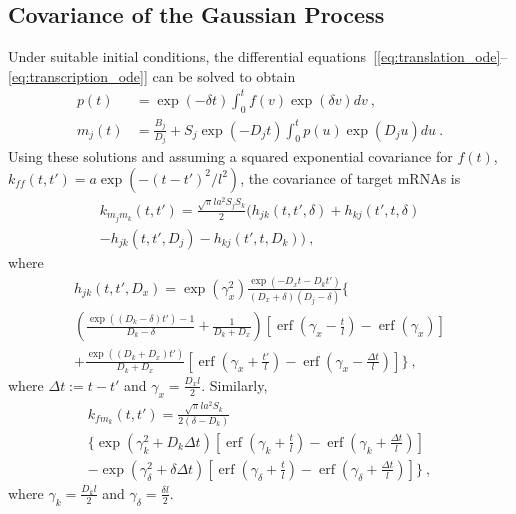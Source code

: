 \documentclass{pnastwo}
\newcommand{\erf}{\operatorname{erf}}
\begin{document}
\begin{article}
\begin{materials}
  \section{Covariance of the Gaussian Process}
  Under suitable initial conditions, the differential
  equations~[\ref{eq:translation_ode}--\ref{eq:transcription_ode}]
  can be solved to obtain
  \begin{align*}
    p(t) &= \exp(-\delta t) \int_0^t f(v) \exp(\delta v) dv\ , \\
    m_j(t) &= \frac{B_j}{D_j} + S_j \exp(-D_j t) \int_0^t p(u)
    \exp(D_j u) du\ .
  \end{align*}
  Using these solutions and assuming a squared exponential covariance
  for $f(t)$, $k_{ff}(t, t') = a \exp( -(t-t')^2/l^2)$, the covariance of target mRNAs is
  \begin{multline*}
    k_{m_j m_k}(t, t')
    = \frac{\sqrt{\pi} l a^2 S_j S_k}{2} \bigg(
    h_{jk}(t, t', \delta) + h_{kj}(t', t, \delta) \\
    - h_{jk}(t, t', D_j) - h_{kj}(t', t, D_k)
    \bigg)\ ,
  \end{multline*}
  where
  \begin{multline*}
    h_{jk}(t, t', D_x) = 
    \exp\left(\gamma_x^2\right)
    \frac{\exp(-D_x t - D_k t')}{(D_x + \delta) (D_j - \delta)}
    \bigg\{ 
    \\
    \left(\frac{\exp((D_k-\delta) t') - 1}{D_k-\delta} +
      \frac{1}{D_k + D_x} \right)
    \left[\erf\left(\gamma_x - \frac{t}{l}\right) - \erf\left(\gamma_x\right)\right]
    \\
    + \frac{\exp((D_k+D_x)t')}{D_k+D_x}
    \left[\erf\left(\gamma_x + \frac{t'}{l}\right)
    - \erf\left(\gamma_x - \frac{\Delta t}{l}\right)\right]
    \bigg\}\ ,
  \end{multline*}
  where $\Delta t := t - t'$ and $\gamma_x = \frac{D_x l}{2}$.
  Similarly, 
  \begin{multline*}
    k_{f m_k}(t, t')
    = \frac{\sqrt{\pi} l a^2 S_k}{2(\delta - D_k)} \\
    \bigg\{
    \exp\left(\gamma_k^2 + D_k \Delta t \right)
    \left[\erf\left(\gamma_k + \frac{t}{l}\right) - \erf\left(\gamma_k + \frac{\Delta t}{l}\right)\right] \\
    -
    \exp\left(\gamma_\delta^2 + \delta \Delta t\right)
    \left[\erf\left(\gamma_\delta + \frac{t}{l}\right) - \erf\left(\gamma_\delta + \frac{\Delta t}{l}\right)\right]
    \bigg\}\ ,
  \end{multline*}
  where $\gamma_k = \frac{D_k l}{2}$ and $\gamma_\delta = \frac{\delta l}{2}$.


\end{materials}
\end{article}
\end{document}
